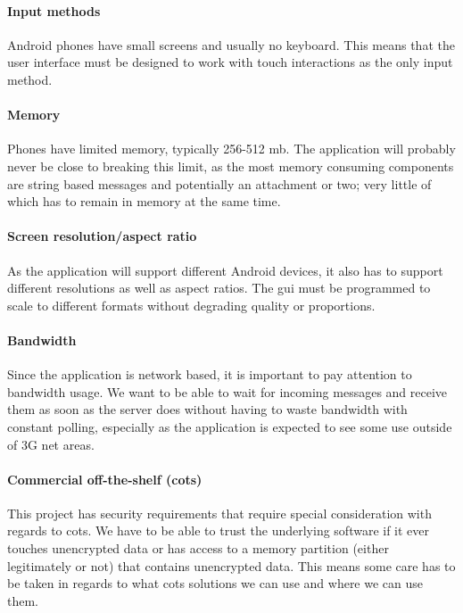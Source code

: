 \paragraph{Input methods} \hfill
\newline
Android phones have small screens and usually no keyboard. This means that the user interface must be designed to work with touch interactions as the only input method.

\paragraph{Memory}\hfill
\newline
Phones have limited memory, typically 256-512 \gls{mb}. The application will probably never be close to breaking this limit, as the most memory consuming components are string based messages and potentially an attachment or two; very little of which has to remain in memory at the same time.

\paragraph{Screen resolution/aspect ratio} \hfill
\newline
As the application will support different Android devices, it also has to support different resolutions as well as aspect ratios. The \gls{gui} must be programmed to scale to different formats without degrading quality or proportions.

\paragraph{Bandwidth} \hfill
\newline
Since the application is network based, it is important to pay attention to bandwidth usage. We want to be able to wait for incoming messages and receive them as soon as the server does without having to waste bandwidth with constant polling, especially as the application is expected to see some use outside of 3G net areas.

\paragraph{Commercial off-the-shelf (\gls{cots})} \hfill
\newline
This project has security requirements that require special consideration with regards to \gls{cots}. We have to be able to trust the underlying software if it ever touches unencrypted data or has access to a memory partition (either legitimately or not) that contains unencrypted data. This means some care has to be taken in regards to what \gls{cots} solutions we can use and where we can use them. 

